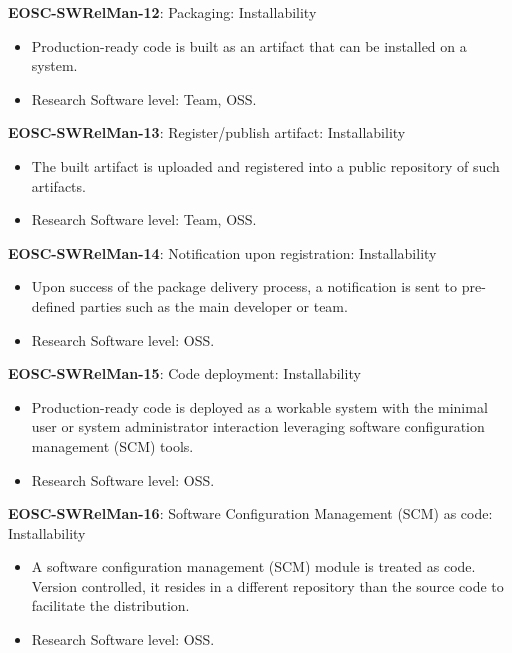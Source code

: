 \textbf{EOSC-SWRelMan-12}: Packaging: Installability

\begin{itemize}
    \item Production-ready code is  built as an artifact that can be installed on a system.~\cite{shepherdson_cessda_2019,orviz_set_2017,raymond_software_2013}
    \item Research Software level: Team, OSS.
\end{itemize}

\textbf{EOSC-SWRelMan-13}: Register/publish artifact: Installability

\begin{itemize}
    \item The built artifact is uploaded and registered into a public repository of such artifacts.~\cite{orviz_set_2017}
    \item Research Software level: Team, OSS.
\end{itemize}

\textbf{EOSC-SWRelMan-14}: Notification upon registration: Installability

\begin{itemize}
    \item Upon success of the package delivery process, a notification is sent to pre-defined parties such as the main developer or team.~\cite{orviz_set_2017}
    \item Research Software level: OSS.
\end{itemize}

\textbf{EOSC-SWRelMan-15}: Code deployment: Installability

\begin{itemize}
    \item Production-ready code is deployed as a workable system with the minimal user or system administrator interaction leveraging software configuration management (SCM) tools.~\cite{orviz_set_2017}
    \item Research Software level: OSS.
\end{itemize}

\textbf{EOSC-SWRelMan-16}: Software Configuration Management (SCM) as code: Installability

\begin{itemize}
    \item A software configuration management (SCM) module is treated as code. Version controlled, it resides in a different repository than the source code to facilitate the distribution.~\cite{orviz_set_2017}
    \item Research Software level: OSS.
\end{itemize}

